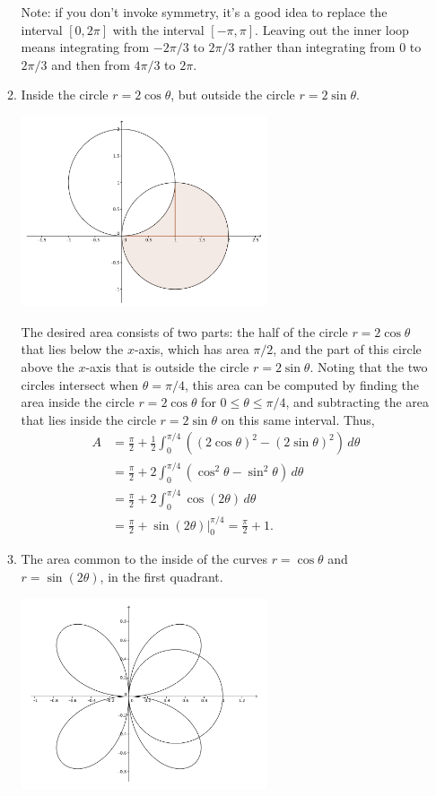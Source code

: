 \documentclass[12pt]{article}
\begin{document}
\begin{enumerate}
\begin{enumerate}
Note: if you don't invoke symmetry, it's a good idea to replace the interval $[0,2\pi]$ with the interval $[-\pi,\pi]$. Leaving out the inner loop means integrating from $-2\pi/3$ to $2\pi/3$ rather than integrating from 0 to $2\pi/3$ and then from $4\pi/3$ to $2\pi$.

 \item Inside the circle $r=2\cos\theta$, but outside the circle $r=2\sin\theta$.

\begin{center}
 \includegraphics[width=0.6\textwidth]{WS6-4c}
\end{center}

The desired area consists of two parts: the half of the circle $r=2\cos\theta$ that lies below the $x$-axis, which has area $\pi/2$, and the part of this circle above the $x$-axis that is outside the circle $r=2\sin\theta$. Noting that the two circles intersect when $\theta=\pi/4$, this area can be computed by finding the area inside the circle $r=2\cos\theta$ for $0\leq \theta\leq \pi/4$, and subtracting the area that lies inside the circle $r=2\sin\theta$ on this same interval. Thus,
\begin{align*}
 A & = \frac{\pi}{2} + \frac{1}{2}\int_0^{\pi/4}((2\cos\theta)^2-(2\sin\theta)^2)\,d\theta\\
& = \frac{\pi}{2} + 2\int_0^{\pi/4}(\cos^2\theta-\sin^2\theta)\,d\theta\\
& = \frac{\pi}{2} + 2\int_0^{\pi/4}\cos(2\theta)\,d\theta\\
& = \frac{\pi}{2} + \sin(2\theta)\vert_0^{\pi/4} = \frac{\pi}{2}+1.
\end{align*}

 \item The area common to the inside of the curves $r=\cos\theta$ and $r=\sin(2\theta)$, in the first quadrant.

\begin{center}
 \includegraphics[width=0.6\textwidth]{WS6-4d}
\end{center}


\end{enumerate}
\end{enumerate}
\end{document}
